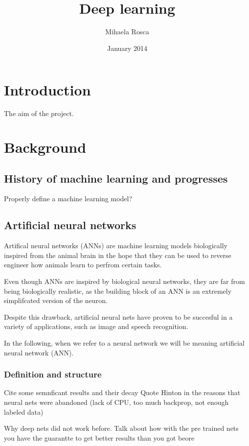 \documentclass[11pt, fleqn, twoside]{article}
\title{Deep learning}
\author{Mihaela Rosca}
\date{January 2014}
\begin{document}
\maketitle
\tableofcontents
\listoffigures

\section{Introduction}
  The aim of the project.

\section{Background}

\subsection{History of machine learning and progresses}
 Properly define a machine learning model?

\subsection{Artificial neural networks}

  Artifical neural networks (ANNs) are machine learning models biologically inspired from the animal brain in the hope that they can be used to reverse engineer how animals learn to perfrom certain tasks.

  Even though ANNs are inspired by biological neural networks, they are far from being biologically realistic, as the building block of an ANN is an extremely simplifcated version of the neuron.

  Despite this drawback, artificial neural nets have proven to be succesful in a variety of applications, such as image and speech recognition.

  In the following, when we refer to a neural network we will be meaning artificial neural network (ANN).


\subsubsection {Definition and structure}

 Cite some semnficant results and their decay
 Quote Hinton in the reasons that neural nets were abandoned (lack of CPU, too much backprop, not enough labeled data)

 Why deep nets did not work before. Talk about how with the pre trained nets you have the guarantte to get better results
  than you got beore
\end{document}
